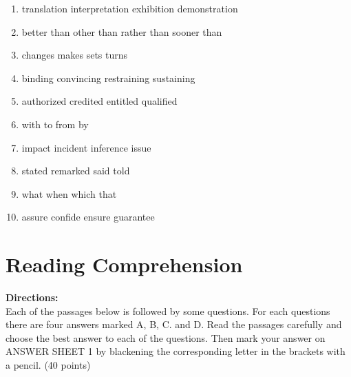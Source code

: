 \begin{enumerate}
\item

\fourchoices
{translation}
{interpretation}
{exhibition}
{demonstration}



\item


\fourchoices
{better than}
{other than}
{rather than}
{sooner than}




\item


\fourchoices
{changes}
{makes}
{sets}
{turns}




\item


\fourchoices
{binding}
{convincing}
{restraining}
{sustaining}




\item


\fourchoices
{authorized}
{credited}
{entitled}
{qualified}




\item


\fourchoices
{with}
{to}
{from}
{by}




\item


\fourchoices
{impact}
{incident}
{inference}
{issue}




\item


\fourchoices
{stated}
{remarked}
{said}
{told}




\item

\fourchoices
{what}
{when}
{which}
{that}




\item


\fourchoices
{assure}
{confide}
{ensure}
{guarantee}

\end{enumerate}

\vfil

\section{ Reading Comprehension}

\noindent
\textbf{Directions:}\\
Each of the passages below is followed by some questions. For
each questions there are four answers marked A, B,
C.
and
D.  Read the passages carefully and choose the best answer to
each of the questions. Then mark your answer on ANSWER SHEET 1 by
blackening the corresponding letter in the brackets with a pencil. (40
points)


